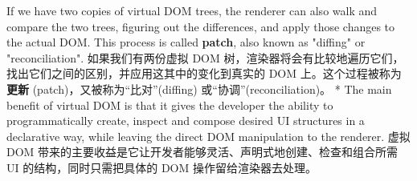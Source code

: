 \begin{paracol}{2}
If we have two copies of virtual DOM trees, the renderer can also walk
and compare the two trees, figuring out the differences, and apply those
changes to the actual DOM. This process is called \textbf{patch}, also
known as "diffing" or "reconciliation".
\switchcolumn
如果我们有两份虚拟 DOM
树，渲染器将会有比较地遍历它们，找出它们之间的区别，并应用这其中的变化到真实的
DOM 上。这个过程被称为\textbf{更新} (patch)，又被称为``比对''(diffing)
或``协调''(reconciliation)。
\switchcolumn[0]*%
The main benefit of virtual DOM is that it gives the developer the
ability to programmatically create, inspect and compose desired UI
structures in a declarative way, while leaving the direct DOM
manipulation to the renderer.
\switchcolumn
虚拟 DOM
带来的主要收益是它让开发者能够灵活、声明式地创建、检查和组合所需 UI
的结构，同时只需把具体的 DOM 操作留给渲染器去处理。
\end{paracol}




